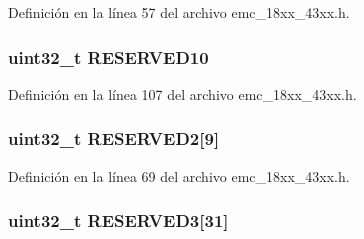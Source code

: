 Definición en la línea 57 del archivo emc\+\_\+18xx\+\_\+43xx.\+h.

\subsubsection[{\texorpdfstring{R\+E\+S\+E\+R\+V\+E\+D10}{RESERVED10}}]{ uint32\+\_\+t R\+E\+S\+E\+R\+V\+E\+D10}\hypertarget{struct_l_p_c___e_m_c___t_a8f13124b4971fb50e86f5d00ffc698ec}{}\label{struct_l_p_c___e_m_c___t_a8f13124b4971fb50e86f5d00ffc698ec}


Definición en la línea 107 del archivo emc\+\_\+18xx\+\_\+43xx.\+h.

\subsubsection[{\texorpdfstring{R\+E\+S\+E\+R\+V\+E\+D2}{RESERVED2}}]{ uint32\+\_\+t R\+E\+S\+E\+R\+V\+E\+D2\mbox{[}9\mbox{]}}\hypertarget{struct_l_p_c___e_m_c___t_a766ff0c9eff7cbd7d9d00b7c8f055397}{}\label{struct_l_p_c___e_m_c___t_a766ff0c9eff7cbd7d9d00b7c8f055397}


Definición en la línea 69 del archivo emc\+\_\+18xx\+\_\+43xx.\+h.

\subsubsection[{\texorpdfstring{R\+E\+S\+E\+R\+V\+E\+D3}{RESERVED3}}]{ uint32\+\_\+t R\+E\+S\+E\+R\+V\+E\+D3\mbox{[}31\mbox{]}}\hypertarget{struct_l_p_c___e_m_c___t_a5781779fee44f03ebdf3490592a06d7c}{}\label{struct_l_p_c___e_m_c___t_a5781779fee44f03ebdf3490592a06d7c}


